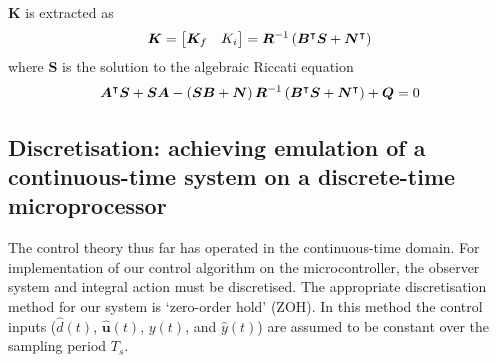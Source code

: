 $\boldsymbol{K}$ is extracted as
\begin{align*}
\boldsymbol{K}
=
\begin{bmatrix}
\boldsymbol{K}_f & K_i
\end{bmatrix}
=
\boldsymbol{R}^{{-} 1} \left(\boldsymbol{B}^\intercal \boldsymbol{S} + \boldsymbol{N}^\intercal\right)
\end{align*}
where $\boldsymbol{S}$ is the solution to the algebraic Riccati equation
\begin{align*}
\boldsymbol{A}^\intercal \boldsymbol{S} + \boldsymbol{S}\boldsymbol{A} - \left(\boldsymbol{S}\boldsymbol{B} + \boldsymbol{N}\right)\boldsymbol{R}^{{-} 1} \left(\boldsymbol{B}^\intercal \boldsymbol{S} + \boldsymbol{N}^\intercal\right) + \boldsymbol{Q} = 0
\end{align*}
\subsection{Discretisation: achieving emulation of a continuous-time system on a discrete-time microprocessor}\label{sec:disc}
The control theory thus far has operated in the continuous-time domain. For implementation of our control algorithm on the microcontroller, the observer system and integral action must be discretised. The appropriate discretisation method for our system is `zero-order hold' (ZOH). In this method the control inputs ($\hat{d}(t)$, $\hat{\boldsymbol{u}}(t)$, $y(t)$, and $\hat{y}(t)$) are assumed to be constant over the sampling period $T_s$.
